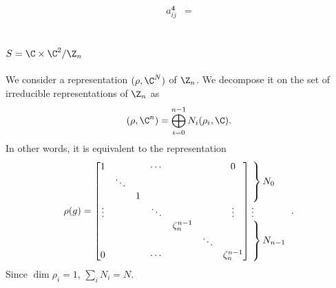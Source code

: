 \documentclass{worksheetclass}
\begin{document}
        \begin{align}
            a^{\boldsymbol{4}}_{ij} &= 
        \end{align}

    \subsection{$S=\C\times\C^2/\Z_n$}

        We consider a representation $(\rho,\C^N)$ of $\Z_n$. We decompose it on the set of irreducible representations of $\Z_n$ as
        \begin{equation}
            (\rho,\C^n)=\bigoplus^{n-1}_{i=0}N_i(\rho_i,\C).
        \end{equation}
        In other words, it is equivalent to the representation
        \begin{equation}
            \rho(g)=
            \begin{bmatrix}
                1 & & & \cdots & & & 0 \\
                & \ddots & & & & & \\
                & & 1 & & & &  \\
                \vdots & & & \ddots & & & \vdots \\
                & & & & \zeta^{n-1}_n & & \\
                & & & & & \ddots & \\
                0 & & & \cdots & & & \zeta^{n-1}_n 
            \end{bmatrix}
            \hspace{-0.2cm}
            \begin{tabular}{l}
            $\left.\lefteqn{\phantom{
                \begin{matrix}
                    a_0\\ \ddots\\ a_0\ 
                \end{matrix} 
            }}\right\}N_0$\\
            \vdots \\
            $\left.\lefteqn{\phantom{
                \begin{matrix}
                    b_0\\ \ddots\\ b_0\ 
                \end{matrix}
            }} \right\}N_{n-1}$
            \end{tabular}.\label{eq:reprrhoZn}
        \end{equation}
        Since $\dim\rho_i=1$, $\sum_i N_i=N$. 
\end{document}
